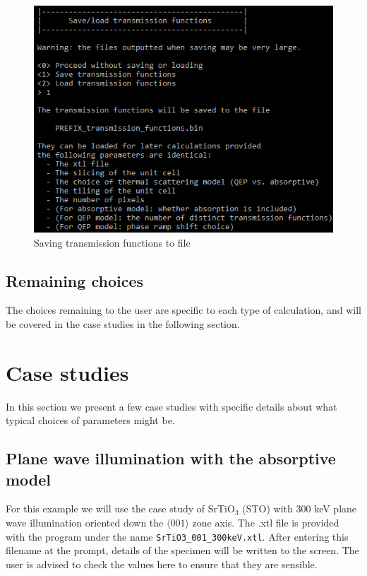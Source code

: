 \documentclass[12pt,a4paper]{article}
\begin{document}
\begin{figure}[!h]
\begin{center}
    \includegraphics[scale=0.75]{save_grates.png}
\caption{Saving transmission functions to file}
\label{fig:save_grates}
\end{center}
\end{figure}

\subsection{Remaining choices}

The choices remaining to the user are specific to each type of calculation, and will be covered in the case studies in the following section.




\section{Case studies}

In this section we present a few case studies with specific details about what typical choices of parameters might be.

\subsection{Plane wave illumination with the absorptive model}
\label{sec:abs_hrtem}

For this example we will use the case study of SrTiO$_3$ (STO) with 300 keV plane wave illumination oriented down the $\langle 001 \rangle$ zone axis.
The .xtl file is provided with the program under the name \verb|SrTiO3_001_300keV.xtl|.
After entering this filename at the prompt, details of the specimen will be written to the screen.
The user is advised to check the values here to ensure that they are sensible.
\end{document}
